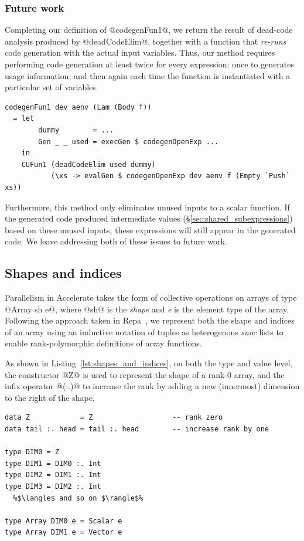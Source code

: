 \subsubsection{Future work}

Completing our definition of @codegenFun1@, we return the result of
dead-code analysis produced by @deadCodeElim@, together with a function
that \emph{re-runs} code generation with the actual input variables. Thus, our
method requires performing code generation at least twice for every expression:
once to generates usage information, and then again each time the function is
instantiated with a particular set of variables.
%
\begin{lstlisting}[style=haskell,firstnumber=7]
codegenFun1 dev aenv (Lam (Body f))
  = let
        dummy        = ...
        Gen _ _ used = execGen $ codegenOpenExp ...
    in
    CUFun1 (deadCodeElim used dummy)
           (\xs -> evalGen $ codegenOpenExp dev aenv f (Empty `Push` xs))
\end{lstlisting}

Furthermore, this method only eliminates unused inputs to a scalar function. If
the generated code produced intermediate values
(\S\ref{sec:shared_subexpressions}) based on these unused inputs, these
expressions will still appear in the generated code. We leave addressing both of
these issues to future work.


\subsection{Shapes and indices}

Parallelism in Accelerate takes the form of collective operations on arrays of
type @Array sh e@, where @sh@ is the \emph{shape} and \emph{e} is the
element type of the array. Following the approach taken in
Repa~\cite{Keller:2010er,Lippmeier:2012gx}, we represent both the shape and
indices of an array using an inductive notation of tuples as heterogenous
\emph{snoc} lists to enable rank-polymorphic definitions of array functions.

As shown in Listing~\ref{lst:shapes_and_indices}, on both the type and value
level, the constructor @Z@ is used to represent the shape of a rank-0
array, and the infix operator @(:.)@ to increase the rank by adding a new
(innermost) dimension to the right of the shape.

\begin{lstlisting}[style=haskell
    ,float
    ,label=lst:shapes_and_indices
    ,caption={Types of array shapes and indices}]
data Z            = Z                   -- rank zero
data tail :. head = tail :. head        -- increase rank by one

type DIM0 = Z
type DIM1 = DIM0 :. Int
type DIM2 = DIM1 :. Int
type DIM3 = DIM2 :. Int
  %$\langle$ and so on $\rangle$%

type Array DIM0 e = Scalar e
type Array DIM1 e = Vector e
\end{lstlisting}

